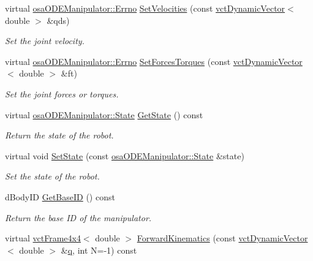 \begin{DoxyCompactItemize}
virtual \hyperlink{classrob_manipulator_a7bbb51cdb81c9c681075a9274ca0cdc0}{osa\-O\-D\-E\-Manipulator\-::\-Errno} \hyperlink{classosa_o_d_e_manipulator_a07ba1e375b9382c8cf2c64af1443b89c}{Set\-Velocities} (const \hyperlink{classvct_dynamic_vector}{vct\-Dynamic\-Vector}$<$ double $>$ \&qds)
\begin{DoxyCompactList}\small\item\em Set the joint velocity. \end{DoxyCompactList}\item 
virtual \hyperlink{classrob_manipulator_a7bbb51cdb81c9c681075a9274ca0cdc0}{osa\-O\-D\-E\-Manipulator\-::\-Errno} \hyperlink{classosa_o_d_e_manipulator_ab7ed549d20e7fabb9c4a4331cc5db15c}{Set\-Forces\-Torques} (const \hyperlink{classvct_dynamic_vector}{vct\-Dynamic\-Vector}$<$ double $>$ \&ft)
\begin{DoxyCompactList}\small\item\em Set the joint forces or torques. \end{DoxyCompactList}\item 
virtual \hyperlink{classosa_o_d_e_manipulator_a56c8457aa6c0240b62580dcfce383ed2}{osa\-O\-D\-E\-Manipulator\-::\-State} \hyperlink{classosa_o_d_e_manipulator_a1e1c3b429b4a872f72c728b58633435c}{Get\-State} () const 
\begin{DoxyCompactList}\small\item\em Return the state of the robot. \end{DoxyCompactList}\item 
virtual void \hyperlink{classosa_o_d_e_manipulator_a721bf18eff3cc6f50d6b1d750141403a}{Set\-State} (const \hyperlink{classosa_o_d_e_manipulator_a56c8457aa6c0240b62580dcfce383ed2}{osa\-O\-D\-E\-Manipulator\-::\-State} \&state)
\begin{DoxyCompactList}\small\item\em Set the state of the robot. \end{DoxyCompactList}\item 
d\-Body\-I\-D \hyperlink{classosa_o_d_e_manipulator_a58ae1c77ed73ffff8e5afe899b3645d6}{Get\-Base\-I\-D} () const 
\begin{DoxyCompactList}\small\item\em Return the base I\-D of the manipulator. \end{DoxyCompactList}\item 
virtual \hyperlink{classvct_frame4x4}{vct\-Frame4x4}$<$ double $>$ \hyperlink{classosa_o_d_e_manipulator_a4c8716edca99fed055a5516a250018ee}{Forward\-Kinematics} (const \hyperlink{classvct_dynamic_vector}{vct\-Dynamic\-Vector}$<$ double $>$ \&\hyperlink{classosa_o_s_g_manipulator_a834ce7263dace4d925133753522abaa3}{q}, int N=-\/1) const 

\end{DoxyCompactItemize}

